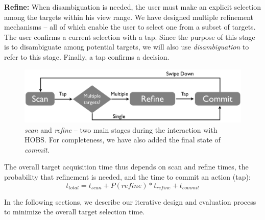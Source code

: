 {\bf Refine:} When disambiguation is needed, the user must make an explicit selection among the targets within his view range. We have designed multiple refinement mechanisms -- all of which enable the user to select one from a subset of targets. The user confirms a current selection with a tap. Since the purpose of this stage is to disambiguate among potential targets, we will also use {\em disambiguation} to refer to this stage. Finally, a tap confirms a decision.


\begin{figure}[t!]
\centering
\includegraphics[width=\columnwidth]{figures/interactionModel2.pdf}
\caption{{\em scan} and {\em refine} -- two main stages during the interaction with HOBS. For completeness, we have also added the final state of {\em commit}.} 
\label{fig:interaction}
\end{figure}

The overall target acquisition time thus depends on scan and refine times, the probability that refinement is needed, and the time to commit an action (tap):
\begin{equation}
t_{total}=t_{scan}+P(refine)*t_{refine}+t_{commit}
\label{eq:time}
\end{equation}

In the following sections, we describe our iterative design and evaluation process to minimize the overall target selection time.


